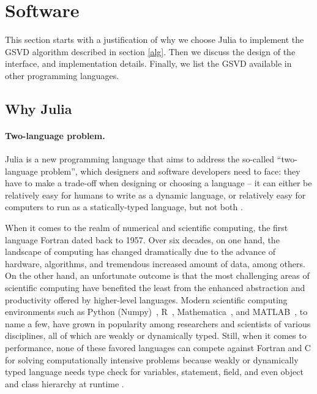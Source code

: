 \section{Software} \label{sec:software} 

This section starts with a justification of why we choose Julia to 
implement the GSVD algorithm described in section \ref{alg}. 
Then we discuss the design of the interface, and implementation details. 
Finally, we list the GSVD available in other 
programming languages. 

\subsection{Why Julia}

\paragraph{Two-language problem.}

Julia is a new programming language that aims to address 
the so-called ``two-language problem'',  which designers 
and software developers need to face: they have to make a trade-off 
when designing or choosing a language -- it can either be relatively 
easy for humans to write as a dynamic language, or relatively easy for 
computers to run as a statically-typed language, 
but not both \cite{perkel2019julia}.

When it comes to the realm of numerical and scientific computing, 
the first language Fortran \cite{10.5555/541529} 
dated back to 1957. Over six decades, on one hand,
the landscape of computing has changed dramatically due to the 
advance of hardware, algorithms, and tremendous increased amount of data, 
among others. On the other hand, an unfortunate outcome is that the most challenging areas 
of scientific computing have benefited the least from the enhanced 
abstraction and productivity offered by higher-level languages. 
Modern scientific computing environments such as 
Python (Numpy)~\cite{van2011numpy}, 
R~\cite{ihaka1996r}, 
Mathematica~\cite{math}, and 
MATLAB~\cite{MATLAB}, to name a few, 
have grown in popularity among researchers and scientists of various disciplines, 
all of which are weakly or dynamically typed. 
Still, when it comes to performance, none of these favored languages 
can compete against Fortran and C for solving computationally intensive problems
because weakly or dynamically typed language needs type check for variables, statement, field,
and even object and class hierarchy at runtime \cite{bezanson2017julia}. 

